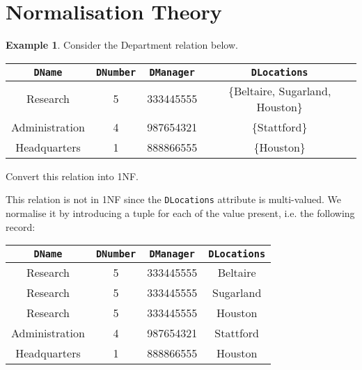 \documentclass[a4paper, openany]{memoir}
\theoremstyle{definition}
\newtheorem{example}[subsection]{Example}
\begin{document}
    \section{Normalisation Theory}
    \begin{example}
        Consider the Department relation below.
        \begin{table}[H]
            \centering
            \begin{tabular}{|c|c|c|c|}
                \hline
                \texttt{DName} & \texttt{DNumber} & \texttt{DManager} & \texttt{DLocations} \\
                \hline
                Research & 5 & 333445555 & \{Beltaire, Sugarland, Houston\} \\
                Administration & 4 & 987654321 & \{Stattford\} \\
                Headquarters & 1 & 888866555 & \{Houston\} \\
                \hline
            \end{tabular}
        \end{table}
        Convert this relation into 1NF.
    \end{example}
    \begin{answer}
        This relation is not in 1NF since the \texttt{DLocations} attribute is multi-valued. We normalise it by introducing a tuple for each of the value present, i.e. the following record:
        \begin{table}[H]
            \centering
            \begin{tabular}{|c|c|c|c|}
                \hline
                \texttt{DName} & \texttt{DNumber} & \texttt{DManager} & \texttt{DLocations} \\
                \hline
                Research & 5 & 333445555 & Beltaire \\
                Research & 5 & 333445555 & Sugarland \\
                Research & 5 & 333445555 & Houston \\
                Administration & 4 & 987654321 & Stattford \\
                Headquarters & 1 & 888866555 & Houston \\
                \hline
            \end{tabular}
        \end{table}
    \end{answer}
\end{document}
